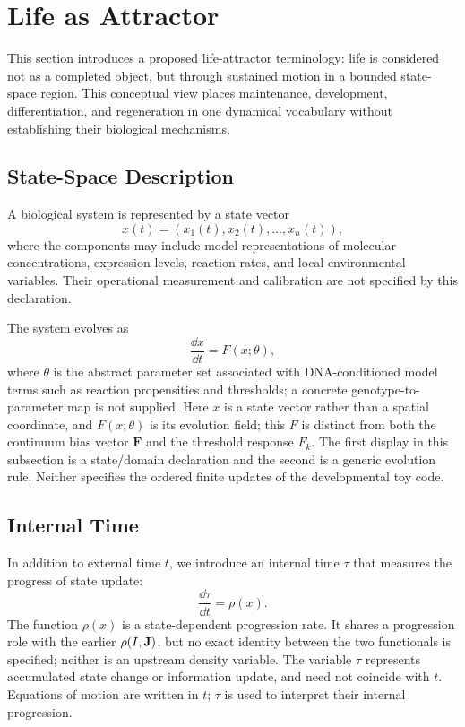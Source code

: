 \section{Life as Attractor}

This section introduces a proposed life-attractor terminology: life is considered not as a completed object, but through sustained motion in a bounded state-space region. This conceptual view places maintenance, development, differentiation, and regeneration in one dynamical vocabulary without establishing their biological mechanisms.

\subsection{State-Space Description}

A biological system is represented by a state vector
\begin{equation}
  x(t) = (x_1(t),x_2(t),\ldots,x_n(t)),
\end{equation}
where the components may include model representations of molecular concentrations, expression levels, reaction rates, and local environmental variables. Their operational measurement and calibration are not specified by this declaration.

The system evolves as
\begin{equation}
  \frac{\dd x}{\dd t} = F(x;\theta),
\end{equation}
where \(\theta\) is the abstract parameter set associated with DNA-conditioned model terms such as reaction propensities and thresholds; a concrete genotype-to-parameter map is not supplied.
Here \(x\) is a state vector rather than a spatial coordinate, and \(F(x;\theta)\) is its evolution field; this \(F\) is distinct from both the continuum bias vector \(\mathbf{F}\) and the threshold response \(F_k\).
The first display in this subsection is a state/domain declaration and the second is a generic evolution rule. Neither specifies the ordered finite updates of the developmental toy code.

\subsection{Internal Time}

In addition to external time \(t\), we introduce an internal time \(\tau\) that measures the progress of state update:
\begin{equation}
  \frac{\dd \tau}{\dd t} = \rho(x).
\end{equation}
The function \(\rho(x)\) is a state-dependent progression rate. It shares a progression role with the earlier \(\rho(I,\mathbf{J})\), but no exact identity between the two functionals is specified; neither is an upstream density variable. The variable \(\tau\) represents accumulated state change or information update, and need not coincide with \(t\). Equations of motion are written in \(t\); \(\tau\) is used to interpret their internal progression.

